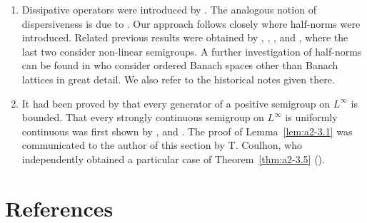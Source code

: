 \begin{enumerate}[label=\emph{Section 2.\arabic*:}, wide, itemsep=1ex]
The characterization of a core as \enquote{domain of uniqueness} given in Theorem~\ref{thm:a2-1.33}   seems to be new.
In this section we have presented part of the standard theory of one-parameter semigroups including some new aspects.
A very elegant brief introduction to one-parameter semigroups is given in the treatise of \textcite{kato:1976} where one can also find all the results on perturbation theory going beyond the elementary facts we discuss here.
Complete information on the general theory can be obtained by consulting the books of \textcite{davies:1980}, \textcite{goldstein:1985a} and \textcite{pazy:1983}.
The monograph of \textcite{goldstein:1985a} contains a variety of examples and applications.

\item 
Dissipative operators were introduced by \textcite{lumerphillips:1961}.
The analogous notion of dispersiveness is due to \textcite{phillips:1962}.
Our approach follows closely \textcite{arendtchernoffkato:1982} where half-norms were introduced.
Related previous results were obtained by \textcite{calvert:1971a}, \textcite{hasegawa:1966}, \textcite{sato:1968}, \textcite{benilanpicard:1979} and \textcite{picard:1972}, where the last two consider non-linear semigroups.
A further investigation of half-norms can be found in \textcite{battyrobinson:1984} who consider ordered Banach spaces other than Banach lattices in great detail.
We also refer to the historical notes given there.

\item
It had been proved by \textcite{kishimotorobinson:1981} that every generator of a positive semigroup on $L^{\infty}$ is bounded.
That every strongly continuous semigroup on $L^{\infty}$ is uniformly continuous was first shown by \textcite{lotz:1982}, \textcite{lotz:1984} and \textcite{lotz:1985}.
The proof of Lemma~\ref{lem:a2-3.1}  was communicated to the author of this section by T. Coulhon, who independently obtained a particular case of Theorem~\ref{thm:a2-3.5} (\textcite{coulhon:1984}).

\end{enumerate}
\section*{References}
{\RaggedRight
  \printbibliography[heading=none]
 }

